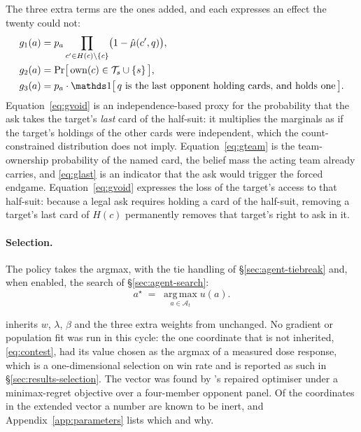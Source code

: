 The three extra terms are the ones \vsix{} added, and each expresses an effect the twenty could not:
\begin{align}
  g_1(a) &= p_a \prod_{c' \in H(c) \setminus \{c\}} \bigl(1 - \hat\mu(c',q)\bigr),
    \label{eq:gvoid}\\
  g_2(a) &= \Pr\bigl[\,\mathrm{own}(c) \in \mathcal{T}_s \cup \{s\}\,\bigr],
    \label{eq:gteam}\\
  g_3(a) &= p_a \cdot \ind\bigl[\,q \text{ is the last opponent holding cards, and holds one}\,\bigr].
    \label{eq:glast}
\end{align}
Equation~\eqref{eq:gvoid} is an independence-based proxy for the probability that the ask takes
the target's \emph{last} card of the half-suit: it multiplies the marginals as if the target's
holdings of the other cards were independent, which the count-constrained distribution does not
imply. Equation~\eqref{eq:gteam} is the team-ownership probability of the named card, the belief
mass the acting team already carries, and \eqref{eq:glast} is an indicator that the ask would
trigger the forced endgame. Equation~\eqref{eq:gvoid} expresses the loss of the target's access to
that half-suit: because a legal ask requires holding a card of the half-suit, removing a target's
last card of $H(c)$ permanently removes that target's right to ask in it.

\paragraph{Selection.} The policy takes the argmax, with the tie handling of
\S\ref{sec:agent-tiebreak} and, when enabled, the search of \S\ref{sec:agent-search}:
\begin{equation}
  a^\star \;=\; \operatorname*{arg\,max}_{a \in \mathcal{A}_t} u(a).
  \label{eq:argmax}
\end{equation}

\sestina{} inherits $w$, $\lambda$, $\beta$ and the three extra weights from \vsix{} unchanged.
No gradient or population fit was run in this cycle: the one coordinate that is not
inherited, \eqref{eq:contest}, had its value chosen as the argmax of a measured dose response, which
is a one-dimensional selection on win rate and is reported as such in
\S\ref{sec:results-selection}. The vector was found by \vsix{}'s repaired
optimiser under a minimax-regret objective over a four-member opponent panel. Of the
\vsevenCoordinates{} coordinates in the extended vector a number are known to be inert, and
Appendix~\ref{app:parameters} lists which and why.

